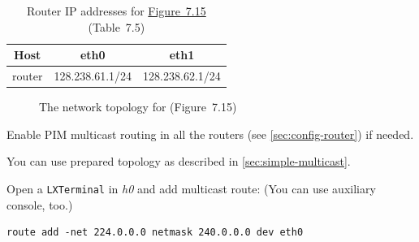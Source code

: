 \documentclass{../UTNetLab}
\begin{document}
\begin{table}[H]
    \caption{Router IP addresses for \hyperref[fig:7.15]{Figure~7.15} (Table~7.5)}
    \label{tab:7.5}
    \centering
    \begin{tabular}{ *3c }
        \hline \hline
        Host   & eth0            & eth1            \\
        \hline
        router & 128.238.61.1/24 & 128.238.62.1/24 \\
        \hline \hline
    \end{tabular}
\end{table}

\begin{figure}[H]
    \centering
    \caption{The network topology for  (Figure~7.15)}
    \label{fig:7.15}
\end{figure}

Enable PIM multicast routing in all the routers (see \autoref{sec:config-router}) if needed.

You can use prepared topology as described in \autoref{sec:simple-multicast}.

Open a \texttt{LXTerminal} in \textit{h0} and add multicast route: (You can use auxiliary console, too.)

\begin{lstlisting}[emph={eth0}]
route add -net 224.0.0.0 netmask 240.0.0.0 dev eth0
    \end{lstlisting}
\end{document}
